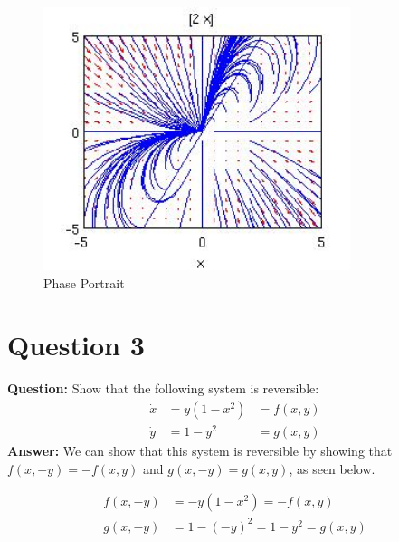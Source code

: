 \documentclass[12pt]{article}
\newenvironment{myenv}{\begin{adjustwidth}{1cm}{}}{\end{adjustwidth}}
\begin{document}
\begin{myenv}
\begin{figure} [H]
    \centering
    \includegraphics[width=0.8\textwidth]{Question2_PhasePortrait}
    \caption{ Phase Portrait}
    \label{figure:a0}
\end{figure}
\end{myenv}

\section*{Question 3}
\textbf{Question:} Show that the following system is reversible:
\begin{alignat*}{3}
\dot{x} &= y(1-x^2) &= f(x,y)\\
\dot{y} &= 1-y^2 &= g(x,y)
\end{alignat*}
\textbf{Answer:} We can show that this system is reversible by showing that $f(x,-y) = -f(x,y)$ and $g(x,-y) = g(x,y)$, as seen below.

\begin{alignat*}{3}
f(x,-y) &= -y(1-x^2) = -f(x,y) \\
g(x,-y) &= 1 - (-y)^2 = 1-y^2 = g(x,y)
\end{alignat*}
\end{document}
